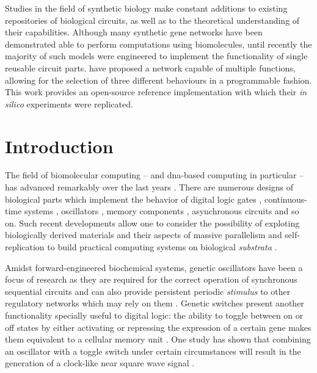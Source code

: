 
  \noindent Studies in the field of synthetic biology make constant additions to existing repositories of biological circuits, as well as to the theoretical understanding of their capabilities.
  Although many synthetic gene networks have been demonstrated able to perform computations using biomolecules, until recently the majority of such models were engineered to implement the functionality of single reusable circuit parts.
  \citet{multif} have proposed a network capable of multiple functions, allowing for the selection of three different behaviours in a programmable fashion.
  This work provides an open-source reference implementation with which their \textit{in silico} experiments were replicated.


\section{Introduction}

  The field of biomolecular computing -- and \acs{dna}-based computing in particular -- has advanced remarkably over the last years \cite{history}.
  There are numerous designs of biological parts which implement the behavior of digital logic gates \cite{reconfgate}, continuous-time systems \cite{analog}, oscillators \cite{repressilator}, memory components \cite{register}, asynchronous circuits \cite{async} and so on.
  Such recent developments allow one to consider the possibility of exploting biologically derived materials and their aspects of massive parallelism and self-replication to build practical computing systems on biological \textit{substrata} \cite{youtuber}.

  Amidst forward-engineered biochemical systems, genetic oscillators have been a focus of research \cite{optoscillator} as they are required for the correct operation of synchronous sequential circuits and can also provide persistent periodic \textit{stimulus} to other regulatory networks which may rely on them \cite{bioapps}.
  Genetic switches present another functionality specially useful \cite{bioapps} to digital logic: the ability to toggle between on or off states by either activating or repressing the expression of a certain gene makes them equivalent to a cellular memory unit \cite{youtuber}.
  One study has shown that combining an oscillator with a toggle switch under certain circumstances will result in the generation of a clock-like near square wave signal \cite{clock}.

